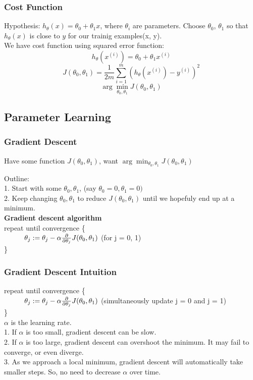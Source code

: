 \documentclass{article}
\newcommand\tab[1][1cm]{\hspace*{#1}}
\begin{document}
\subsubsection{Cost Function}
Hypothesis: $h_\theta(x) = \theta_0 + \theta_1 x$, where $\theta_i$ are parameters.
Choose $\theta_0$, $\theta_1$ so that $h_\theta(x)$ is close to $y$ for our trainig examples(x, y). \\

We have cost function using squared error function: 
$$h_\theta(x^{(i)}) = \theta_0 + \theta_1 x^{(i)}$$
$$J(\theta_0, \theta_1) = \frac{1}{2m} \sum_{i=1}^{m}(h_\theta(x^{(i)}) - y^{(i)})^2$$
$$\arg\min_{\theta_0, \theta_1}J(\theta_0, \theta_1) $$

\subsection{Parameter Learning}
\subsubsection{Gradient Descent}
Have some function $J(\theta_0, \theta_1)$, want $\arg\min_{\theta_0, \theta_1}J(\theta_0, \theta_1)$

Outline: \\

1. Start with some $\theta_0, \theta_1$, (say $\theta_0 = 0, \theta_1 = 0)$ \\
2. Keep changing $\theta_0, \theta_1$ to reduce $J(\theta_0, \theta_1)$ until we hopefuly end up at a minimum. \\

\textbf{Gradient descent algorithm}\\
repeat until convergence \{\\
$\tab \theta_j := \theta_j - \alpha \frac{\partial}{\partial \theta_j}J(\theta_0, \theta_1) $ (for j = 0, 1)\\
\}

\subsubsection{Gradient Descent Intuition}
repeat until convergence \{\\
$\tab \theta_j := \theta_j - \alpha \frac{\partial}{\partial \theta_j}J(\theta_0, \theta_1) $ (simultaneously update j = 0 and j = 1)\\
\}\\

$\alpha$ is the learning rate. \\
1. If $\alpha$ is too small, gradient descent can be slow. \\
2. If $\alpha$ is too large, gradient descent can overshoot the minimum. It may fail to converge, or even diverge. \\
3. As we approach a local minimum, gradient descent will automatically take smaller steps. So, no need to decrease $\alpha$ over time. \\
\end{document}
